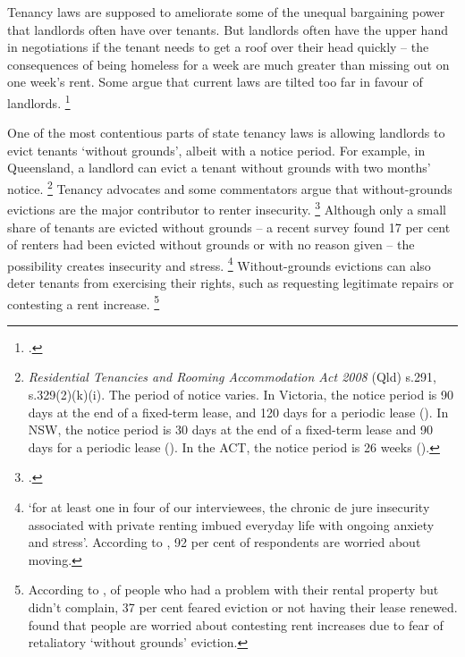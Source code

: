 Tenancy laws are supposed to ameliorate some of the unequal bargaining power that landlords often have over tenants.
But landlords often have the upper hand in negotiations if the tenant needs to get a roof over their head quickly -- the consequences of being homeless for a week are much greater than missing out on one week's rent.
Some argue that current laws are tilted too far in favour of landlords.%
	\footcites{Power-2017-theConvo-For-renters-housing-affordable-just-the-start}[][8]{Natl-Shelter-2017-Life-in-Aust-private-rental-market}{Irvine-2016-SMH-Hidden-tax-hurts-renters}

One of the most contentious parts of state tenancy laws is allowing landlords to evict tenants `without grounds', albeit with a notice period.
For example, in Queensland, a landlord can evict a tenant without grounds with two months' notice.%
	\footnote{\textit{Residential Tenancies and Rooming Accommodation Act 2008} (Qld) s.291, s.329(2)(k)(i).
	The period of notice varies.
	In Victoria, the notice period is 90 days at the end of a fixed-term lease, and 120 days for a periodic lease (\textcite{Consumer-Affairs-Vic-Landlord-giving-notice-to-vacate}).
	In NSW, the notice period is 30 days at the end of a fixed-term lease and 90 days for a periodic lease (\textcite{NSW-Fair-Trading-Giving-termination-notice}).
	In the ACT, the notice period is 26 weeks (\textcite{Morris-etal-2017-theConvo-Insecurity-private-renters}).}
Tenancy advocates and some commentators argue that without-grounds evictions are the major contributor to renter insecurity.%
	\footcites[][66]{Hulse-etal-2011-AHURI-Secure-occupancy-rental-housing}{Power-2017-theConvo-For-renters-housing-affordable-just-the-start}[][8]{Natl-Shelter-2017-Life-in-Aust-private-rental-market}{Irvine-2016-SMH-Hidden-tax-hurts-renters}[][12--13]{Adkins-etal-2002-Tenure-security-Qld}{Martin2017renting}
Although only a small share of tenants are evicted without grounds -- a recent survey found 17 per cent of renters had been evicted without grounds or with no reason given -- the possibility creates insecurity and stress.%
	\footnote{\textcite{Morris-etal-2017-theConvo-Insecurity-private-renters} `for at least one in four of our interviewees, the chronic de jure insecurity associated with private renting imbued everyday life with ongoing anxiety and stress'.
	According to \textcite{NSW-Tenants-Union-2014-Survey-report}, 92 per cent of respondents are worried about moving.}
Without-grounds evictions can also deter tenants from exercising their rights, such as requesting legitimate repairs or contesting a rent increase.%
	\footnote{According to \textcite{Natl-Shelter-2017-Life-in-Aust-private-rental-market}, of people who had a problem with their rental property but didn't complain, 37 per cent feared eviction or not having their lease renewed.
	\textcite[][12]{Adkins-etal-2002-Tenure-security-Qld} found that people are worried about contesting rent increases due to fear of retaliatory `without grounds' eviction.}

